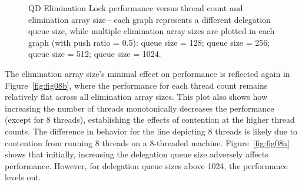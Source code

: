 \begin{figure}[!t]
\caption[]{QD Elimination Lock performance versus thread count and elimination array size - each graph represents a different delegation queue size, while multiple elimination array sizes are plotted in each graph (with push ratio = 0.5):  queue size = 128;  queue size = 256;  queue size = 512;  queue size = 1024.}
\label{fig:thrd_and_elsize}
\end{figure}

The elimination array size's minimal effect on performance is reflected again in Figure~\ref{fig:fig08b}, where the performance for each thread count remains relatively flat across all elimination array sizes. This plot also shows how increasing the number of threads monotonically decreases the performance (except for 8 threads), establishing the effects of contention at the higher thread counts. The difference in behavior for the line depicting 8 threads is likely due to contention from running 8 threads on a 8-threaded machine. Figure~\ref{fig:fig08a} shows that initially, increasing the delegation queue size adversely affects performance. However, for delegation queue sizes above 1024, the performance levels out.

